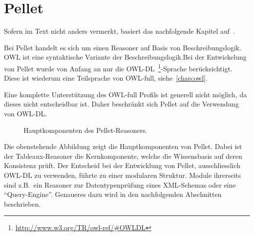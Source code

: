\section{Pellet}
\label{sec:inferenz_pellet}
Sofern im Text nicht anders vermerkt, basiert das nachfolgende Kapitel auf~\cite{sirin:pellet05}.

Bei Pellet handelt es sich um einen Reasoner auf Basis von Beschreibungslogik. OWL ist eine syntaktische Variante der Beschreibungslogik.\@ Bei der Entwickelung von Pellet wurde von Anfang an nur die OWL-DL~\footnote{\url{http://www.w3.org/TR/owl-ref/\#OWLDL}}-Sprache berücksichtigt. Diese ist wiederum eine Teilsprache von OWL-full, siehe~\autoref{chap:owl}.

Eine komplette Unterstützung des OWL-full Profils ist generell nicht möglich, da dieses nicht entscheidbar ist. Daher beschränkt sich Pellet auf die Verwendung von OWL-DL\@.~\cite[Seite 13]{sirin:pellet05}

\begin{figure}[htbp]
\centering {}
\caption{Hauptkomponenten des Pellet-Reasoners.\label{fig:pellet_komponenten}\protect\footnotemark}
\end{figure}

Die obenstehende Abbildung zeigt die Hauptkomponenten von Pellet. Dabei ist der Tableaux-Reasoner die Kernkomponente, welche die Wissensbasis auf deren Konsistenz prüft. Der Entscheid bei der Entwicklung von Pellet, ausschliesslich OWL-DL zu verwenden, führte zu einer modularen Struktur. Module ihrerseits sind z.B.\ ein Reasoner zur Datentypenprüfung eines XML-Schemas oder eine ``Query-Engine''. Genaueres dazu wird in den nachfolgenden Abschnitten beschrieben.

